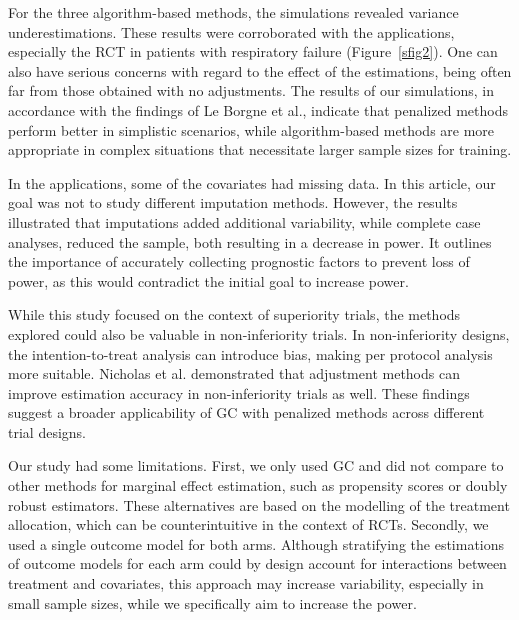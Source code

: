 \documentclass{article}
\begin{document}
For the three algorithm-based methods, the simulations revealed variance underestimations. These results were corroborated with the applications, especially the RCT in patients with respiratory failure (Figure~\ref{sfig2}). One can also have serious concerns with regard to the effect of the estimations, being often far from those obtained with no adjustments.
The results of our simulations, in accordance with the findings of Le Borgne et al.\cite{le_borgne_g-computation_2021}, indicate that penalized methods perform better in simplistic scenarios, while algorithm-based methods are more appropriate in complex situations that necessitate larger sample sizes for training. \cite{van_der_ploeg_modern_2014}

In the applications, some of the covariates had missing data. In this article, our goal was not to study different imputation methods. However, the results illustrated that imputations added additional variability, while complete case analyses, reduced the sample, both resulting in a decrease in power.
It outlines the importance of accurately collecting prognostic factors to prevent loss of power, as this would contradict the initial goal to increase power.


While this study focused on the context of superiority trials, the methods explored could also be valuable in non-inferiority trials. In non-inferiority designs, the intention-to-treat analysis can introduce bias, making per protocol analysis more suitable. \cite{schumi_through_2011} Nicholas et al. demonstrated that adjustment methods can improve estimation accuracy in non-inferiority trials as well.\cite{nicholas_impact_2015} These findings suggest a broader applicability of GC with penalized methods across different trial designs.

Our study had some limitations. First, we only used GC and did not compare to other methods for marginal effect estimation, such as propensity scores or doubly robust estimators. These alternatives are based on the modelling of the treatment allocation, which can be counterintuitive in the context of RCTs. 
Secondly, we used a single outcome model for both arms. Although stratifying the estimations of outcome models for each arm could by design account for interactions between treatment and covariates,\cite{kunzel_metalearners_2019} this approach may increase variability, especially in small sample sizes, while we specifically aim to increase the power.
\end{document}

